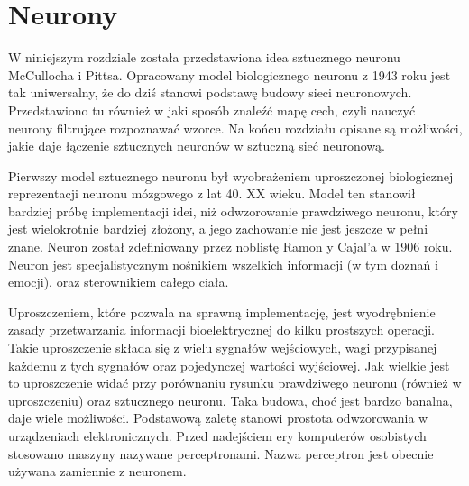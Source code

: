 \documentclass[12pt,a4paper,twoside,titlepage,openright]{book}
\begin{document}

\chapter{Neurony}
W niniejszym rozdziale została przedstawiona idea sztucznego neuronu McCullocha i Pittsa. Opracowany model biologicznego neuronu z 1943 roku jest tak uniwersalny, że do dziś stanowi podstawę budowy sieci neuronowych. Przedstawiono tu również w jaki sposób znaleźć mapę cech, czyli nauczyć neurony filtrujące rozpoznawać wzorce. Na końcu rozdziału opisane są możliwości, jakie daje łączenie sztucznych neuronów w sztuczną sieć neuronową.

Pierwszy model sztucznego neuronu był wyobrażeniem uproszczonej biologicznej reprezentacji neuronu mózgowego z lat 40. XX wieku. Model ten stanowił bardziej próbę implementacji idei, niż odwzorowanie prawdziwego neuronu, który jest wielokrotnie bardziej złożony, a jego zachowanie nie jest jeszcze w pełni znane. Neuron został zdefiniowany przez noblistę Ramon y Cajal'a w 1906 roku. Neuron jest specjalistycznym nośnikiem wszelkich informacji (w tym doznań i emocji), oraz sterownikiem całego ciała.

Uproszczeniem, które pozwala na sprawną implementację, jest wyodrębnienie zasady przetwarzania informacji bioelektrycznej do kilku prostszych operacji. Takie uproszczenie składa się z wielu sygnałów wejściowych, wagi przypisanej każdemu z tych sygnałów oraz pojedynczej wartości wyjściowej. Jak wielkie jest to uproszczenie widać przy porównaniu rysunku prawdziwego neuronu (również w uproszczeniu) oraz sztucznego neuronu. Taka budowa, choć jest bardzo banalna, daje wiele możliwości. Podstawową zaletę stanowi prostota odwzorowania w urządzeniach elektronicznych. Przed nadejściem ery komputerów osobistych stosowano maszyny nazywane perceptronami. Nazwa perceptron jest obecnie używana zamiennie z neuronem.\cite{odkrywanieSieci}
\end{document}
